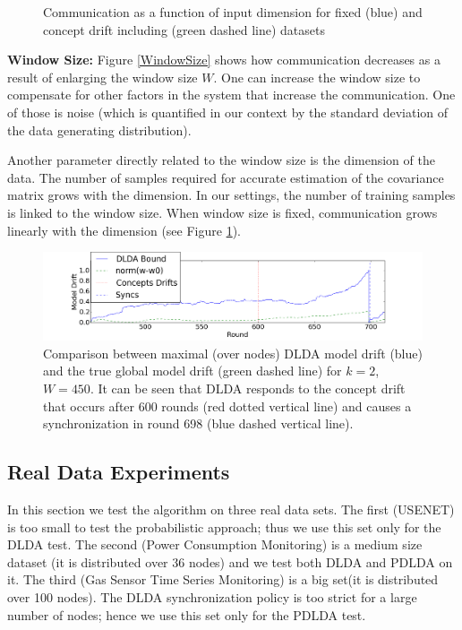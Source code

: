 \documentclass{vldb}
\begin{document}
\begin{figure}[!htb]
  \caption{Communication as a function of input dimension for fixed (blue) and
  concept drift including (green  dashed line) datasets}\label{Dimension}
\endminipage
\end{figure}

\noindent\textbf{Window Size:}
Figure \ref{WindowSize} shows how communication decreases as a result
of enlarging the window size $W$.  One can increase the window size to compensate for other factors in the system that increase the communication. One of those is
noise (which is quantified in our context by the standard deviation of the
data generating distribution).


Another parameter directly related to the window size is the dimension of the data. The number of samples required for accurate estimation of the covariance matrix grows with the dimension. In our settings, the number of training samples is linked to the window size. When window size is fixed, communication grows linearly with the dimension (see Figure \ref{Dimension}).



\begin{figure}
	\centering
	\includegraphics[width=\textwidth]{Usenet/DriftDetected.png}
	\caption{Comparison between maximal (over nodes) DLDA model drift (blue)
	and the true global model drift (green dashed line) for $k=2$, $W=450$.
	It can be seen that DLDA responds to the concept drift that occurs
	after 600 rounds (red dotted vertical line) and causes a synchronization in round 698 (blue dashed vertical line).}
	\label{usenet}
	\end{figure}
\subsection{Real Data Experiments}
In this section we test the algorithm on three real data sets. The first
(USENET) is too small to test the probabilistic approach; thus we use this set only for the DLDA test.
The second (Power Consumption Monitoring) is a medium size dataset (it
is distributed over 36 nodes) and we test both DLDA and PDLDA on it.
The third (Gas Sensor Time Series Monitoring) is a big set(it is distributed over
100 nodes). The DLDA synchronization policy is too strict for a large number of nodes; hence we use this set only for the PDLDA test.
\end{document}
